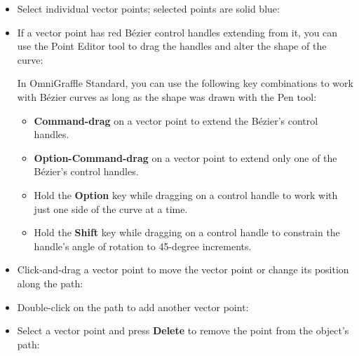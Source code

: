 \documentclass[../main.tex]{subfiles}
\begin{document}
\begin{itemize}
  \item Select individual vector points; selected points are solid blue:

  \item If a vector point has red Bézier control handles extending from it, you can use the
    Point Editor tool to drag the handles and alter the shape of the curve:


    In OmniGraffle Standard, you can use the following key combinations to work with Bézier curves
    as long as the shape was drawn with the Pen tool:

    \begin{itemize}
      \item \textbf{Command-drag} on a vector point to extend the Bézier's control handles.
      \item \textbf{Option-Command-drag} on a vector point to extend only one of the Bézier's
        control handles.
      \item Hold the \textbf{Option} key while dragging on a control handle to work with just one
        side of the curve at a time.
      \item Hold the \textbf{Shift} key while dragging on a control handle to constrain the
        handle's angle of rotation to 45-degree increments.
    \end{itemize}
  \item Click-and-drag a vector point to move the vector point or change its position along the
    path:

  \item Double-click on the path to add another vector point:

  \item Select a vector point and press \textbf{Delete} to remove the point from the object's
    path:

\end{itemize}
\end{document}

